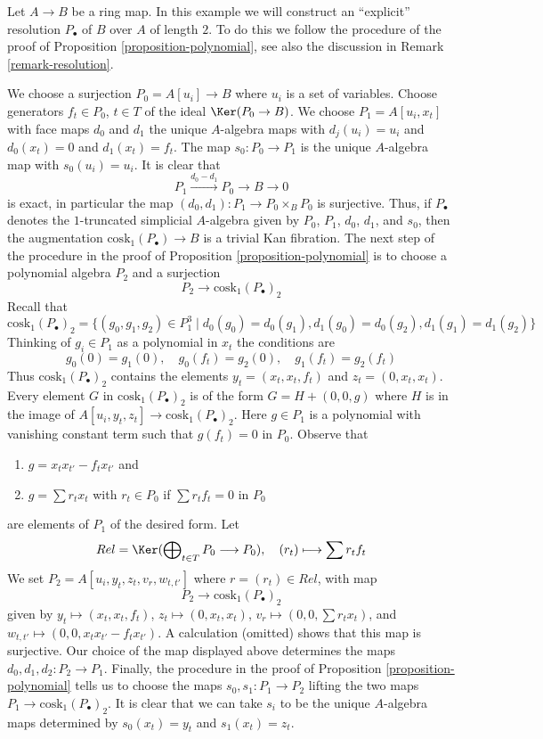 \begin{example}
\label{example-resolution-length-two}
Let $A \to B$ be a ring map. In this example we 
will construct an ``explicit'' resolution $P_\bullet$ of $B$ over $A$ of
length $2$. To do this we follow the procedure of the proof of
Proposition \ref{proposition-polynomial}, see also the discussion in
Remark \ref{remark-resolution}.

\medskip\noindent
We choose a surjection $P_0 = A[u_i] \to B$ where $u_i$ is a set of
variables. Choose generators $f_t \in P_0$, $t \in T$ of the ideal
$\Ker(P_0 \to B)$. We choose $P_1 = A[u_i, x_t]$ with face maps
$d_0$ and $d_1$ the unique $A$-algebra maps with $d_j(u_i) = u_i$
and $d_0(x_t) = 0$ and $d_1(x_t) = f_t$. The map $s_0 : P_0 \to P_1$
is the unique $A$-algebra map with $s_0(u_i) = u_i$. It is clear that
$$
P_1 \xrightarrow{d_0 - d_1} P_0 \to B \to 0
$$
is exact, in particular the map $(d_0, d_1) : P_1 \to P_0 \times_B P_0$
is surjective. Thus, if $P_\bullet$ denotes the $1$-truncated
simplicial $A$-algebra given by $P_0$, $P_1$, $d_0$, $d_1$, and $s_0$, then
the augmentation $\text{cosk}_1(P_\bullet) \to B$ is a trivial Kan fibration.
The next step of the procedure in the proof of
Proposition \ref{proposition-polynomial}
is to choose a polynomial algebra $P_2$ and a surjection
$$
P_2 \longrightarrow \text{cosk}_1(P_\bullet)_2
$$
Recall that
$$
\text{cosk}_1(P_\bullet)_2 =
\{(g_0, g_1, g_2) \in P_1^3 \mid d_0(g_0) = d_0(g_1),
d_1(g_0) = d_0(g_2), d_1(g_1) = d_1(g_2)\}
$$
Thinking of $g_i \in P_1$ as a polynomial in $x_t$ the conditions
are
$$
g_0(0) = g_1(0),\quad
g_0(f_t) = g_2(0),\quad
g_1(f_t) = g_2(f_t)
$$
Thus $\text{cosk}_1(P_\bullet)_2$ contains the elements
$y_t = (x_t, x_t, f_t)$ and $z_t = (0, x_t, x_t)$.
Every element $G$ in $\text{cosk}_1(P_\bullet)_2$ is
of the form $G = H + (0, 0, g)$ where $H$ is in the image
of $A[u_i, y_t, z_t] \to \text{cosk}_1(P_\bullet)_2$. Here
$g \in P_1$ is a polynomial with vanishing
constant term such that $g(f_t) = 0$ in $P_0$. Observe that
\begin{enumerate}
\item $g = x_t x_{t'} - f_t x_{t'}$ and
\item $g = \sum r_t x_t$ with $r_t \in P_0$ if $\sum r_t f_t = 0$ in $P_0$
\end{enumerate}
are elements of $P_1$ of the desired form. Let
$$
Rel = \Ker(\bigoplus\nolimits_{t \in T} P_0 \longrightarrow P_0),\quad
(r_t) \longmapsto \sum r_tf_t
$$
We set $P_2 = A[u_i, y_t, z_t, v_r, w_{t, t'}]$ where
$r = (r_t) \in Rel$, with map
$$
P_2 \longrightarrow \text{cosk}_1(P_\bullet)_2
$$
given by $y_t  \mapsto (x_t, x_t, f_t)$,
$z_t \mapsto (0, x_t, x_t)$,
$v_r \mapsto (0, 0, \sum r_t x_t)$, and
$w_{t, t'} \mapsto (0, 0, x_t x_{t'} - f_t x_{t'})$. A calculation
(omitted) shows that this map is surjective. Our choice of the
map displayed above determines the maps $d_0, d_1, d_2 : P_2 \to P_1$.
Finally, the procedure in the proof of
Proposition \ref{proposition-polynomial}
tells us to choose the maps $s_0, s_1 : P_1 \to P_2$ lifting the two
maps $P_1 \to \text{cosk}_1(P_\bullet)_2$. It is clear that we can take
$s_i$ to be the unique $A$-algebra maps determined by
$s_0(x_t) = y_t$ and $s_1(x_t) = z_t$.
\end{example}
